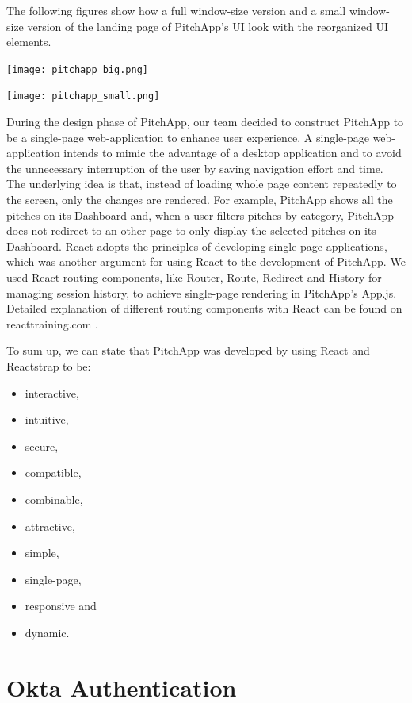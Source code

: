 The following figures show how a full window-size version and a small window-size version of the landing page of PitchApp's UI look with the reorganized UI elements.

\begin{center}
	\texttt{[image: pitchapp\_big.png]}
\end{center} 

\begin{center}
	\texttt{[image: pitchapp\_small.png]}
\end{center} 

During the design phase of PitchApp, our team decided to construct PitchApp to be a single-page web-application to enhance user experience. A single-page web-application intends to mimic the advantage of a desktop application and to avoid the unnecessary interruption of the user by saving navigation effort and time. The underlying idea is that, instead of loading whole page content repeatedly to the screen, only the changes are rendered. For example, PitchApp shows all the pitches on its Dashboard and, when a user filters pitches by category, PitchApp does not redirect to an other page to only display the selected pitches on its Dashboard. React adopts the principles of developing single-page applications, which was another argument for using React to the development of PitchApp. We used React routing components, like Router, Route, Redirect and History for managing session history, to achieve single-page rendering in PitchApp's App.js. Detailed explanation of different routing components with React can be found on reacttraining.com \parencite{React_router}.

To sum up, we can state that PitchApp was developed by using React and Reactstrap to be:

\begin{itemize}
	\item interactive,
	\item intuitive,
	\item secure,
	\item compatible,
	\item combinable,
	\item attractive,
	\item simple,
	\item single-page,
	\item responsive and
	\item dynamic.
\end{itemize}

\section{Okta Authentication}

